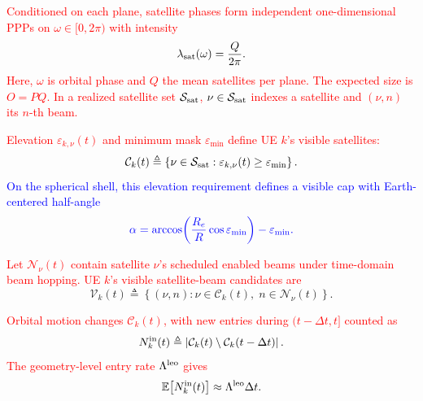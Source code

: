 \documentclass[10pt,letterpaper,journal]{IEEEtran}
\newcommand{\revnew}[1]{\textcolor{red}{#1}}
\begin{document}
\revnew{Conditioned on each plane, satellite phases form independent one-dimensional PPPs on $\omega\in[0,2\pi)$ with intensity}
\begin{equation}
 \lambda_{\rm sat}(\omega)
 =
 \frac{Q}{2\pi}.
 \label{eq:lambda_sat}
\end{equation}
\revnew{Here, $\omega$ is orbital phase and $Q$ the mean satellites per plane.}
\revnew{The expected size is $O=PQ$. In a realized satellite set $\mathcal S_{\rm sat}$, $\nu\in\mathcal S_{\rm sat}$ indexes a satellite and $(\nu,n)$ its $n$-th beam.}

\revnew{Elevation $\varepsilon_{k,\nu}(t)$ and minimum mask $\varepsilon_{\min}$ define UE $k$'s visible satellites:}
\begin{equation}
\mathcal C_k(t)
\triangleq
\left\{
\nu\in\mathcal S_{\rm sat}:
\varepsilon_{k,\nu}(t)\ge \varepsilon_{\min}
\right\}.
\label{eq:visible_satellite_set}
\end{equation}
\textcolor{blue}{On the spherical shell, this elevation requirement defines a visible cap with Earth-centered half-angle}
\begin{equation}
\textcolor{blue}{
\alpha
=\arccos\!\left(\frac{R_e}{R}\cos\varepsilon_{\min}\right)
-\varepsilon_{\min}.}    
\label{half_angle}
\end{equation}

\revnew{Let $\mathcal N_\nu(t)$ contain satellite $\nu$'s scheduled enabled beams under time-domain beam hopping. UE $k$'s visible satellite-beam candidates are}
\begin{equation}
\mathcal V_k(t)
\triangleq
\left\{
(\nu,n):
\nu\in\mathcal C_k(t),\;
n\in\mathcal N_\nu(t)
\right\}.
\label{eq:visible_beam_candidate_set}
\end{equation}

\revnew{Orbital motion changes $\mathcal C_k(t)$, with new entries during $(t-\Delta t,t]$ counted as}
\begin{equation}
N^{\rm in}_{k}(t)
\triangleq
\left|
\mathcal C_k(t)
\setminus
\mathcal C_k(t-\Delta t)
\right|.
\label{eq:new_visible_satellite_count}
\end{equation}
\revnew{The geometry-level entry rate $\Lambda^{\rm leo}$ gives}
\begin{equation}
\mathbb E\!\left[
N^{\rm in}_{k}(t)
\right]
\approx
\Lambda^{\rm leo}\Delta t .
\label{eq:leo_entry_intensity}
\end{equation}
\end{document}
